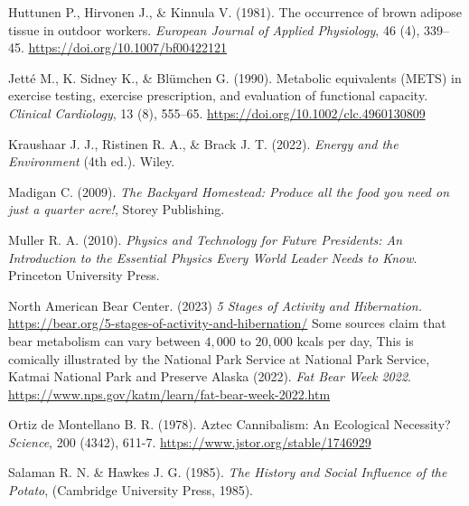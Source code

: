 \documentclass[man]{apa7}
\begin{document}
\begin{thebibliography}{99}
Huttunen P., Hirvonen J., \& Kinnula V.
(1981).
The occurrence of brown adipose tissue in outdoor workers.
\textit{European Journal of Applied Physiology}, 
46 (4), 339--45. 
\url{https://doi.org/10.1007/bf00422121}

Jetté M., K. Sidney K., \& Blümchen G.
(1990). 
Metabolic equivalents (METS) in exercise testing, exercise prescription, and evaluation of functional capacity.
\textit{Clinical Cardiology}, 
13 (8), 555--65.
\url{https://doi.org/10.1002/clc.4960130809}

Kraushaar J. J., Ristinen R. A., \& Brack J. T.
(2022).
\textit{Energy and the Environment} (4th ed.).
Wiley.

Madigan C. 
(2009).
\textit{The Backyard Homestead: Produce all the food you need on just a quarter acre!},
Storey Publishing.



Muller R. A. 
(2010).
\textit{Physics and Technology for Future Presidents: An Introduction to the Essential Physics Every World Leader Needs to Know}.
Princeton University Press.

North American Bear Center.
(2023)
\textit{5 Stages of Activity and Hibernation.}
\url{https://bear.org/5-stages-of-activity-and-hibernation/}
%
Some sources claim that bear metabolism can vary between $4,000$ to $20,000$ kcals per day, 
This is comically illustrated by the National Park Service at 
National Park Service, Katmai National Park and Preserve Alaska 
(2022).
\textit{Fat Bear Week 2022}.
\url{https://www.nps.gov/katm/learn/fat-bear-week-2022.htm}

Ortiz de Montellano B. R.
(1978).
Aztec Cannibalism: An Ecological Necessity?
\textit{Science}, 200 (4342), 611-7.
\url{https://www.jstor.org/stable/1746929}

Salaman R. N. \& Hawkes J. G.
(1985).
\textit{The History and Social Influence of the Potato},
(Cambridge University Press, 1985).


\end{thebibliography}
\end{document}
